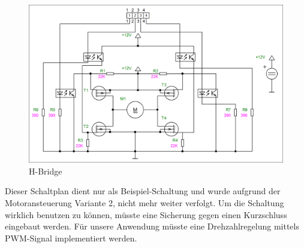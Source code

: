\begin{figure}[H] 
\begin{center}

\includegraphics[width=15cm]{Bilder/Schaltplan/Schaltplan_HBridge}
\caption{H-Bridge}
\label{HBridge}

\end{center}
\end{figure}

Dieser Schaltplan dient nur als Beispiel-Schaltung und wurde aufgrund der Motoransteuerung Variante 2, nicht mehr weiter verfolgt. Um die Schaltung wirklich benutzen zu können, müsste eine Sicherung gegen einen Kurzschluss eingebaut werden. Für unsere Anwendung müsste eine Drehzahlregelung mittels PWM-Signal implementiert werden.
\newpage
